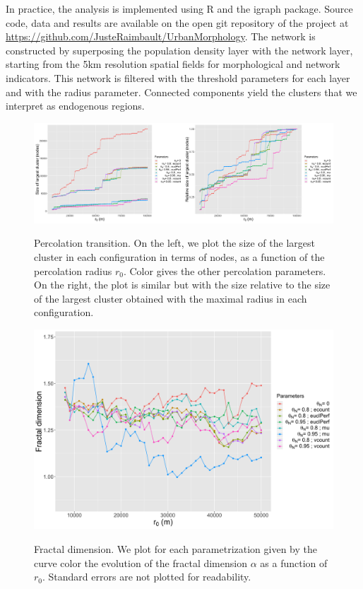 \documentclass{jimis-en}
\begin{document}
In practice, the analysis is implemented using R and the igraph package. Source code, data and results are available on the open git repository of the project at \url{https://github.com/JusteRaimbault/UrbanMorphology}. The network is constructed by superposing the population density layer with the network layer, starting from the 5km resolution spatial fields for morphological and network indicators. This network is filtered with the threshold parameters for each layer and with the radius parameter. Connected components yield the clusters that we interpret as endogenous regions.



\begin{figure}[ht] 
  {\includegraphics[width=\linewidth]{Fig2.png}}
  \centering
  \caption{Percolation transition. On the left, we plot the size of the largest cluster in each configuration in terms of nodes, as a function of the percolation radius $r_0$. Color gives the other percolation parameters. On the right, the plot is similar but with the size relative to the size of the largest cluster obtained with the maximal radius in each configuration.\label{fig:percolation}}
\end{figure}

\begin{figure}[ht] 
  {\includegraphics[width=\linewidth]{Fig3.png}}
  \centering
  \caption{Fractal dimension. We plot for each parametrization given by the curve color the evolution of the fractal dimension $\alpha$ as a function of $r_0$. Standard errors are not plotted for readability.\label{fig:fractaldim}}
\end{figure}
\end{document}
